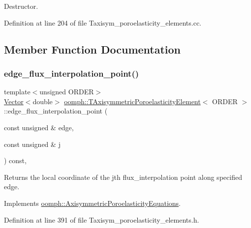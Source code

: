Destructor. 



Definition at line 204 of file Taxisym\+\_\+poroelasticity\+\_\+elements.\+cc.



\subsection{Member Function Documentation}
\mbox{\label{classoomph_1_1TAxisymmetricPoroelasticityElement_a2e9c7f4c54eb8e2ef7c1a6f7b058fc0a}} 
\subsubsection{\texorpdfstring{edge\+\_\+flux\+\_\+interpolation\+\_\+point()}{edge\_flux\_interpolation\_point()}}
{\footnotesize\ttfamily template$<$unsigned O\+R\+D\+ER$>$ \\
\hyperlink{classoomph_1_1Vector}{Vector}$<$double$>$ \hyperlink{classoomph_1_1TAxisymmetricPoroelasticityElement}{oomph\+::\+T\+Axisymmetric\+Poroelasticity\+Element}$<$ O\+R\+D\+ER $>$\+::edge\+\_\+flux\+\_\+interpolation\+\_\+point (\begin{DoxyParamCaption}\item[{const unsigned \&}]{edge,  }\item[{const unsigned \&}]{j }\end{DoxyParamCaption}) const\hspace{0.3cm}{\ttfamily [inline]}, {\ttfamily [virtual]}}



Returns the local coordinate of the jth flux\+\_\+interpolation point along specified edge. 



Implements \hyperlink{classoomph_1_1AxisymmetricPoroelasticityEquations_ad7406482ea1f004642ca1de325a3efd3}{oomph\+::\+Axisymmetric\+Poroelasticity\+Equations}.



Definition at line 391 of file Taxisym\+\_\+poroelasticity\+\_\+elements.\+h.



